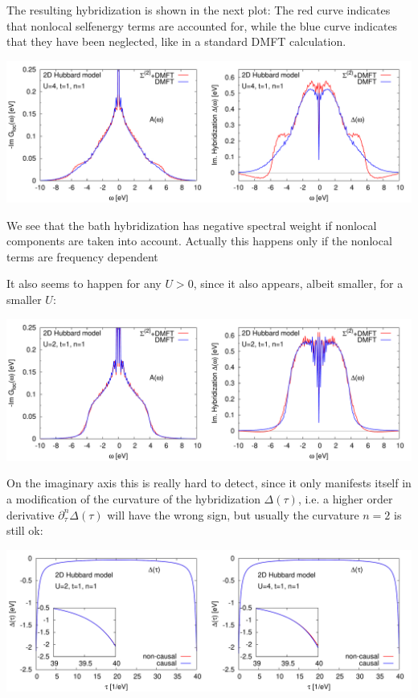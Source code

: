 \documentclass[12pt,a4paper]{scrartcl}
\numberwithin{equation}{section}
\begin{document}
The resulting hybridization is shown in the next plot: The red curve indicates that nonlocal selfenergy terms
are accounted for, while the blue curve indicates that they have been neglected, like in
a standard DMFT calculation.

\includegraphics[width=1.0\textwidth]{hybnoncausal_2dhubbard/2dHubbard_Hyb.pdf}

We see that the bath hybridization has negative spectral weight if nonlocal components
are taken into account.
Actually this happens only if the nonlocal terms are frequency dependent

It also seems to happen for any $U>0$, since it also appears, albeit smaller, for a smaller $U$:

\includegraphics[width=1.0\textwidth]{hybnoncausal_2dhubbard/2dHubbard_HybU2.pdf}

On the imaginary axis this is really hard to detect, since it only manifests itself in a modification of
the curvature of the hybridization $\Delta(\tau)$, i.e. a higher order derivative $\partial^n_{\tau}\Delta(\tau)$ will have
the wrong sign, but usually the curvature $n=2$ is still ok:

\includegraphics[width=1.0\textwidth]{hybnoncausal_2dhubbard/2dHubbard_Delta.pdf}
\end{document}

